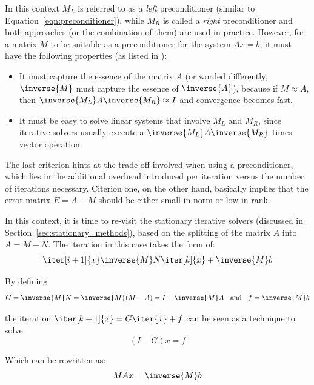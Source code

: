 \noindent In this context $M_L$ is referred to as a \textit{left} preconditioner (similar to Equation~\hyperref[eqn:preconditioner]{\ref{eqn:preconditioner}}), while $M_R$ is called a \textit{right} preconditioner and both approaches (or the combination of them) are used in practice. However, for a matrix $M$ to be suitable as a preconditioner for the system $Ax=b$, it must have the following properties (as listed in \cite{golub_matrix_2013}):
\begin{itemize}
    \item It must capture the essence of the matrix $A$ (or worded differently, $\inverse{M}$ must capture the essence of $\inverse{A}$), because if $M \approx A$, then $\inverse{M_L}A\inverse{M_R} \approx I$ and convergence becomes fast.
    \item It must be easy to solve linear systems that involve $M_L$ and $M_R$, since iterative solvers usually execute a $\inverse{M_L}A\inverse{M_R}$-times vector operation.
\end{itemize}

\noindent The last criterion hints at the trade-off involved when using a preconditioner, which lies in the additional overhead introduced per iteration versus the number of iterations necessary. Citerion one, on the other hand, basically implies that the error matrix $E=A-M$ should be either small in norm or low in rank.

In this context, it is time to re-visit the stationary iterative solvers (discussed in Section~\hyperref[sec:stationary_methods]{\ref{sec:stationary_methods}}), based on the splitting of the matrix $A$ into $A=M-N$. The iteration in this case takes the form of:
\begin{equation}
    \iter[i+1]{x}\inverse{M}N\iter[k]{x}+\inverse{M}b
\end{equation}

\noindent By defining
\begin{equation}
    G=\inverse{M}N=\inverse{M}(M-A)=I-\inverse{M}A\;\; \text{ and } \;\; f=\inverse{M}b
\end{equation}

\noindent the iteration $\iter[k+1]{x}=G\iter{x}+f$ can be seen as a technique to solve:
\begin{equation}
    (I-G)x = f
\end{equation}

\noindent Which can be rewritten as:
\begin{equation}
    {M}Ax = \inverse{M}b
\end{equation}

